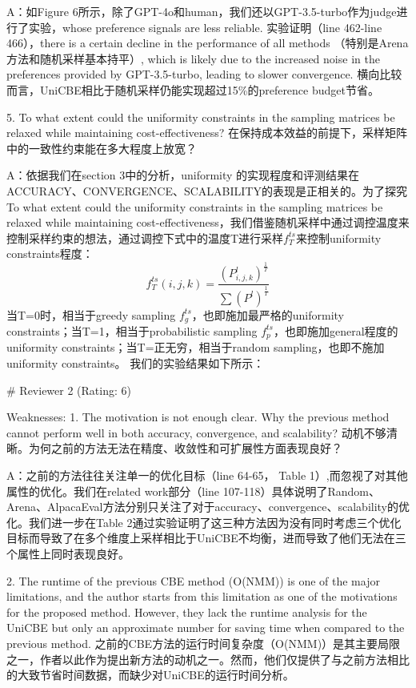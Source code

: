 A：如Figure 6所示，除了GPT-4o和human，我们还以GPT-3.5-turbo作为judge进行了实验，whose preference signals are less reliable. 实验证明（line 462-line 466），there is a certain decline in the performance of all methods （特别是Arena方法和随机采样基本持平）, which is likely due to the increased noise in the preferences provided by GPT-3.5-turbo, leading to slower convergence. 横向比较而言，UniCBE相比于随机采样仍能实现超过15\%的preference budget节省。



5. To what extent could the uniformity constraints in the sampling matrices be relaxed while maintaining cost-effectiveness?
在保持成本效益的前提下，采样矩阵中的一致性约束能在多大程度上放宽？

A：依据我们在section 3中的分析，uniformity 的实现程度和评测结果在ACCURACY、CONVERGENCE、SCALABILITY的表现是正相关的。为了探究To what extent could the uniformity constraints in the sampling matrices be relaxed while maintaining cost-effectiveness，我们借鉴随机采样中通过调控温度来控制采样约束的想法，通过调控下式中的温度T进行采样$f^{ts}_T$来控制uniformity constraints程度：
$$    f^{ts}_T(i,j,k) =\frac{(P^l_{i,j,k})^\frac{1}{T}}{\sum (P^{l})^\frac{1}{T}}$$
当T=0时，相当于greedy sampling $f^{ts}_g$，也即施加最严格的uniformity constraints；当T=1，相当于probabilistic sampling $f^{ts}_p$，也即施加general程度的uniformity constraints；当T=正无穷，相当于random sampling，也即不施加uniformity constraints。
我们的实验结果如下所示：







# Reviewer 2 (Rating: 6)

Weaknesses:
1. The motivation is not enough clear. Why the previous method cannot perform well in both accuracy, convergence, and scalability?
动机不够清晰。为何之前的方法无法在精度、收敛性和可扩展性方面表现良好？

A：之前的方法往往关注单一的优化目标（line 64-65， Table 1）,而忽视了对其他属性的优化。我们在related work部分（line 107-118）具体说明了Random、Arena、AlpacaEval方法分别只关注了对于accuracy、convergence、scalability的优化。我们进一步在Table 2通过实验证明了这三种方法因为没有同时考虑三个优化目标而导致了在多个维度上采样相比于UniCBE不均衡，进而导致了他们无法在三个属性上同时表现良好。



2. The runtime of the previous CBE method (O(NMM)) is one of the major limitations, and the author starts from this limitation as one of the motivations for the proposed method. However, they lack the runtime analysis for the UniCBE but only an approximate number for saving time when compared to the previous method.
之前的CBE方法的运行时间复杂度（O(NMM)）是其主要局限之一，作者以此作为提出新方法的动机之一。然而，他们仅提供了与之前方法相比的大致节省时间数据，而缺少对UniCBE的运行时间分析。

